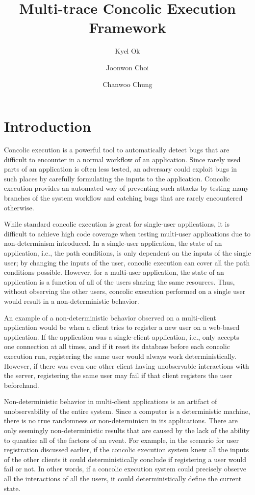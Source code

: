 \documentclass{llncs}
\title{Multi-trace Concolic Execution Framework}
\author{Kyel Ok \and Joonwon Choi \and Chanwoo Chung}
\institute{
  \email{\{kyelok, joonwonc, cwchung\}@mit.edu}
}
\begin{document}
\maketitle

\section{Introduction}

Concolic execution is a powerful tool to automatically detect bugs
that are difficult to encounter in a normal workflow of an
application. Since rarely used parts of an application is often less
tested, an adversary could exploit bugs in such places by carefully
formulating the inputs to the application. Concolic execution provides
an automated way of preventing such attacks by testing many branches
of the system workflow and catching bugs that are rarely encountered
otherwise.

While standard concolic execution is great for single-user
applications, it is difficult to achieve high code coverage when
testing multi-user applications due to non-determinism introduced. In
a single-user application, the state of an application, i.e., the path
conditions, is only dependent on the inputs of the single user; by
changing the inputs of the user, concolic execution can cover all the
path conditions possible. However, for a multi-user application, the
state of an application is a function of all of the users sharing the
same resources. Thus, without observing the other users, concolic
execution performed on a single user would result in a
non-deterministic behavior.

An example of a non-deterministic behavior observed on a multi-client
application would be when a client tries to register a new user on a
web-based application. If the application was a single-client
application, i.e., only accepts one connection at all times, and if it
reset its database before each concolic execution run, registering the
same user would always work deterministically. However, if there was
even one other client having unobservable interactions with the
server, registering the same user may fail if that client registers
the user beforehand.

Non-deterministic behavior in multi-client applications is an artifact
of unobservability of the entire system. Since a computer is a
deterministic machine, there is no true randomness or non-determinism
in its applications. There are only seemingly non-deterministic
results that are caused by the lack of the ability to quantize all of
the factors of an event. For example, in the scenario for user
registration discussed earlier, if the concolic execution system knew
all the inputs of the other clients it could deterministically
conclude if registering a user would fail or not. In other words, if a
concolic execution system could precisely observe all the interactions
of all the users, it could deterministically define the current state.
\end{document}
